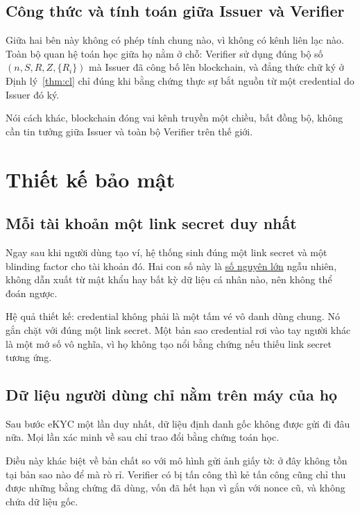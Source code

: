 \documentclass[a4paper,11pt,oneside]{report}
\theoremstyle{definition}
\theoremstyle{plain}
\newcommand{\g}[2]{\hyperref[term:#1]{#2}}
\begin{document}
\section{Công thức và tính toán giữa Issuer và Verifier}

Giữa hai bên này không có phép tính chung nào, vì không có kênh liên lạc nào. Toàn bộ quan hệ
toán học giữa họ nằm ở chỗ: Verifier sử dụng đúng bộ số $(n, S, R, Z, \{R_i\})$ mà
Issuer đã công bố lên blockchain, và đẳng thức chữ ký ở
Định lý~\ref{thm:cl} chỉ đúng khi bằng chứng thực sự bắt nguồn từ một
credential do Issuer đó ký.

Nói cách khác, blockchain đóng vai kênh truyền một chiều, bất đồng bộ, không cần tin tưởng giữa
Issuer và toàn bộ Verifier trên thế giới.

\chapter{Thiết kế bảo mật}

\section{Mỗi tài khoản một link secret duy nhất}

Ngay sau khi người dùng tạo ví, hệ thống sinh đúng một link secret và một
blinding factor cho tài khoản đó. Hai con số này là \g{bigint}{số nguyên lớn} ngẫu
nhiên, không dẫn xuất từ mật khẩu hay bất kỳ dữ liệu cá nhân nào, nên không thể đoán ngược.

Hệ quả thiết kế: credential không phải là một tấm vé vô danh dùng chung. Nó gắn
chặt với đúng một link secret. Một bản sao credential rơi vào tay người khác là một mớ số vô
nghĩa, vì họ không tạo nổi bằng chứng nếu thiếu link secret tương ứng.

\section{Dữ liệu người dùng chỉ nằm trên máy của họ}

Sau bước eKYC một lần duy nhất, dữ liệu định danh gốc không được gửi đi đâu nữa. Mọi
lần xác minh về sau chỉ trao đổi bằng chứng toán học.

Điều này khác biệt về bản chất so với mô hình gửi ảnh giấy tờ: ở đây không tồn tại bản sao nào để
mà rò rỉ. Verifier có bị tấn công thì kẻ tấn công cũng chỉ thu được những bằng
chứng đã dùng, vốn đã hết hạn vì gắn với nonce cũ, và không chứa dữ liệu gốc.
\end{document}
